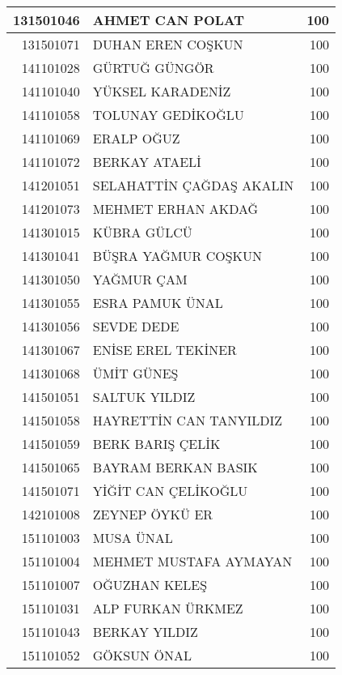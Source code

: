 \documentclass[12pt]{article}
\begin{document}
\begin{longtable}{||r||l||r||}
    131501046 & AHMET CAN POLAT & 100 \\
    \midrule
    131501071 & DUHAN EREN COŞKUN & 100 \\
    \midrule
    141101028 & GÜRTUĞ GÜNGÖR & 100 \\
    \midrule
    141101040 & YÜKSEL KARADENİZ & 100 \\
    \midrule
    141101058 & TOLUNAY GEDİKOĞLU & 100 \\
    \midrule
    141101069 & ERALP OĞUZ & 100 \\
    \midrule
    141101072 & BERKAY ATAELİ & 100 \\
    \midrule
    141201051 & SELAHATTİN ÇAĞDAŞ AKALIN & 100 \\
    \midrule
    141201073 & MEHMET ERHAN AKDAĞ & 100 \\
    \midrule
    141301015 & KÜBRA GÜLCÜ & 100 \\
    \midrule
    141301041 & BÜŞRA YAĞMUR COŞKUN & 100 \\
    \midrule
    141301050 & YAĞMUR ÇAM & 100 \\
    \midrule
    141301055 & ESRA PAMUK ÜNAL & 100 \\
    \midrule
    141301056 & SEVDE DEDE & 100 \\
    \midrule
    141301067 & ENİSE EREL TEKİNER & 100 \\
    \midrule
    141301068 & ÜMİT GÜNEŞ & 100 \\
    \midrule
    141501051 & SALTUK YILDIZ & 100 \\
    \midrule
    141501058 & HAYRETTİN CAN TANYILDIZ & 100 \\
    \midrule
    141501059 & BERK BARIŞ ÇELİK & 100 \\
    \midrule
    141501065 & BAYRAM BERKAN BASIK & 100 \\
    \midrule
    141501071 & YİĞİT CAN ÇELİKOĞLU & 100 \\
    \midrule
    142101008 & ZEYNEP ÖYKÜ ER & 100 \\
    \midrule
    151101003 & MUSA ÜNAL & 100 \\
    \midrule
    151101004 & MEHMET MUSTAFA AYMAYAN & 100 \\
    \midrule
    151101007 & OĞUZHAN KELEŞ & 100 \\
    \midrule
    151101031 & ALP FURKAN ÜRKMEZ & 100 \\
    \midrule
    151101043 & BERKAY YILDIZ & 100 \\
    \midrule
    151101052 & GÖKSUN ÖNAL & 100 \\

\end{longtable}
\end{document}
